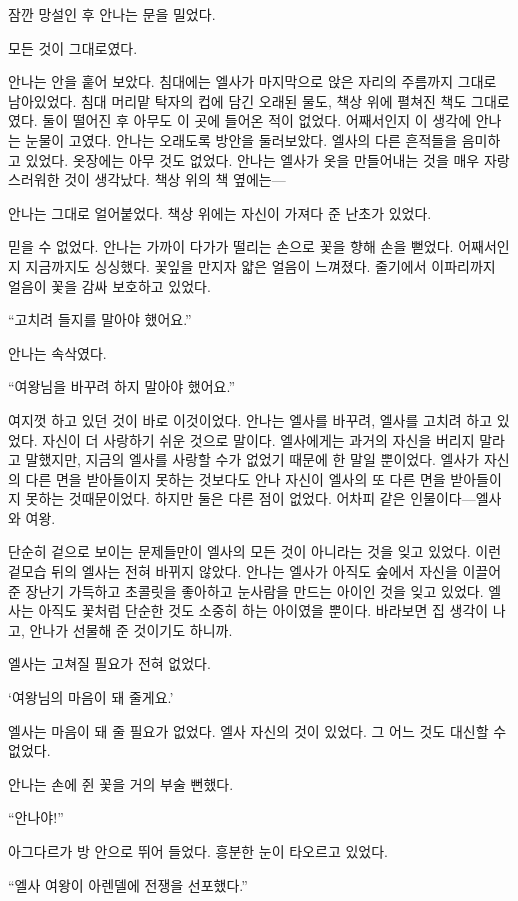 잠깐 망설인 후 안나는 문을 밀었다.


모든 것이 그대로였다.

안나는 안을 훝어 보았다. 침대에는 엘사가 마지막으로 앉은 자리의 주름까지 그대로 남아있었다. 침대 머리맡 탁자의 컵에 담긴 오래된 물도, 책상 위에 펼쳐진 책도 그대로였다. 둘이 떨어진 후 아무도 이 곳에 들어온 적이 없었다. 어째서인지 이 생각에 안나는 눈물이 고였다. 안나는 오래도록 방안을 둘러보았다. 엘사의 다른 흔적들을 음미하고 있었다. 옷장에는 아무 것도 없었다. 안나는 엘사가 옷을 만들어내는 것을 매우 자랑스러워한 것이 생각났다. 책상 위의 책 옆에는—

안나는 그대로 얼어붙었다. 책상 위에는 자신이 가져다 준 난초가 있었다.

믿을 수 없었다. 안나는 가까이 다가가 떨리는 손으로 꽃을 향해 손을 뻗었다. 어째서인지 지금까지도 싱싱했다. 꽃잎을 만지자 얇은 얼음이 느껴졌다. 줄기에서 이파리까지 얼음이 꽃을 감싸 보호하고 있었다.

``고치려 들지를 말아야 했어요.''

안나는 속삭였다.

``여왕님을 바꾸려 하지 말아야 했어요.''

여지껏 하고 있던 것이 바로 이것이었다. 안나는 엘사를 바꾸려, 엘사를 고치려 하고 있었다. 자신이 더 사랑하기 쉬운 것으로 말이다. 엘사에게는 과거의 자신을 버리지 말라고 말했지만, 지금의 엘사를 사랑할 수가 없었기 때문에 한 말일 뿐이었다. 엘사가 자신의 다른 면을 받아들이지 못하는 것보다도 안나 자신이 엘사의 또 다른 면을 받아들이지 못하는 것때문이었다. 하지만 둘은 다른 점이 없었다. 어차피 같은 인물이다—엘사와 여왕.

단순히 겉으로 보이는 문제들만이 엘사의 모든 것이 아니라는 것을 잊고 있었다. 이런 겉모습 뒤의 엘사는 전혀 바뀌지 않았다. 안나는 엘사가 아직도 숲에서 자신을 이끌어 준 장난기 가득하고 초콜릿을 좋아하고 눈사람을 만드는 아이인 것을 잊고 있었다. 엘사는 아직도 꽃처럼 단순한 것도 소중히 하는 아이였을 뿐이다. 바라보면 집 생각이 나고, 안나가 선물해 준 것이기도 하니까.

엘사는 고쳐질 필요가 전혀 없었다.

`여왕님의 마음이 돼 줄게요.'

엘사는 마음이 돼 줄 필요가 없었다. 엘사 자신의 것이 있었다. 그 어느 것도 대신할 수 없었다.

안나는 손에 쥔 꽃을 거의 부술 뻔했다.

``안나야!''

아그다르가 방 안으로 뛰어 들었다. 흥분한 눈이 타오르고 있었다.

``엘사 여왕이 아렌델에 전쟁을 선포했다.''

